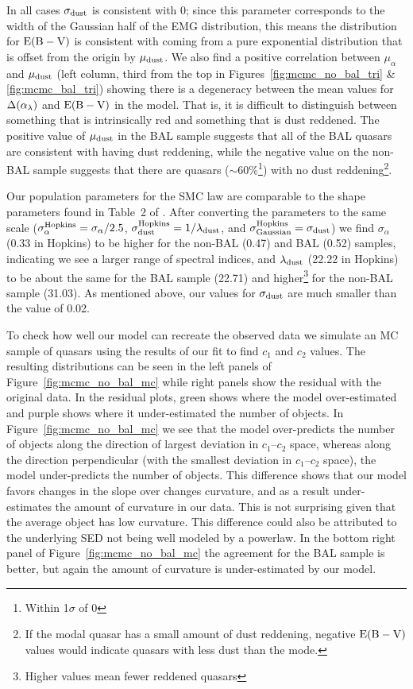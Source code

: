 In all cases $\sigma_{\rm dust}$ is consistent with $0$; since this parameter corresponds to the width of the Gaussian half of the EMG distribution, this means the distribution for ${\rm E(B-V)}$ is consistent with coming from a pure exponential distribution that is offset from the origin by $\mu_{\rm dust}$.  We also find a positive correlation between $\mu_{\alpha}$ and $\mu_{\rm dust}$ (left column, third from the top in Figures~\ref{fig:mcmc_no_bal_tri} \& \ref{fig:mcmc_bal_tri}) showing there is a degeneracy between the mean values for $\Delta(\alpha_{\lambda})$ and ${\rm E(B-V)}$ in the model.
That is, it is difficult to distinguish between something that is intrinsically red and something that is dust reddened. 
The positive value of $\mu_{\rm dust}$ in the BAL sample suggests that all of the BAL quasars are consistent with having dust reddening, while the negative value on the non-BAL sample suggests that there are quasars ($\sim$60\%\footnote{Within 1$\sigma$ of 0}) with no dust reddening\footnote{If the modal quasar has a small amount of dust reddening, negative ${\rm E(B-V)}$ values would indicate quasars with less dust than the mode.}.

Our population parameters for the SMC law are comparable to the shape parameters found in Table~2 of \citet{Hopkins:2004}. After converting the parameters to the same scale ($\sigma_{\alpha}^{\rm Hopkins} = \sigma_{\alpha}/2.5$, $\sigma_{\rm dust}^{\rm Hopkins} = 1/\lambda_{\rm dust}$, and $\sigma_{\rm Gaussian}^{\rm Hopkins}=\sigma_{\rm dust}$) we find $\sigma_{\alpha}$ (0.33 in Hopkins) to be higher for the non-BAL (0.47) and BAL (0.52) samples, indicating we see a larger range of spectral indices,
and $\lambda_{\rm dust}$ (22.22 in Hopkins) to be about the same for the BAL sample (22.71) and higher\footnote{Higher values mean fewer reddened quasars} for the non-BAL sample (31.03).  As mentioned above, our values for $\sigma_{\rm dust}$ are much smaller than the \citet{Hopkins:2004} value of 0.02.

To check how well our model can recreate the observed data
we simulate an MC sample of quasars using the results of our fit to find $c_1$ and $c_2$ values.  The resulting distributions can be seen in the left panels of Figure~\ref{fig:mcmc_no_bal_mc} while right panels show the residual with the original data. In the residual plots, green shows where the model over-estimated and purple shows where it under-estimated the number of objects.  In Figure~\ref{fig:mcmc_no_bal_mc} we see that the model over-predicts the number of objects along the direction of largest deviation in $c_1$--$c_2$ space, whereas along the direction perpendicular (with the smallest deviation in $c_1$--$c_2$ space), the model under-predicts the number of objects.  This difference shows that our model favors changes in the slope over changes curvature, and as a result under-estimates the amount of curvature in our data.  This is not surprising given that the average object has low curvature.  This difference could also be attributed to the underlying SED not being well modeled by a powerlaw.  In the bottom right panel of Figure~\ref{fig:mcmc_no_bal_mc} the agreement for the BAL sample is better, but again the amount of curvature is under-estimated by our model.

